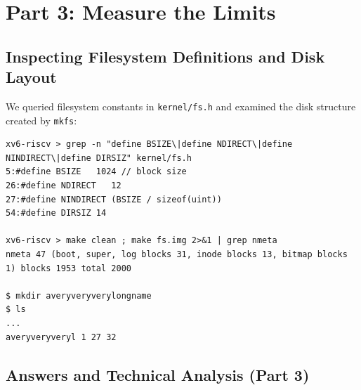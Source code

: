 \documentclass[12pt,a4paper]{article}
\begin{document}
\section{Part 3: Measure the Limits}

\subsection{Inspecting Filesystem Definitions and Disk Layout}
We queried filesystem constants in \texttt{kernel/fs.h} and examined the disk structure created by \texttt{mkfs}:

\begin{lstlisting}[style=consolestyle]
xv6-riscv > grep -n "define BSIZE\|define NDIRECT\|define NINDIRECT\|define DIRSIZ" kernel/fs.h
5:#define BSIZE   1024 // block size
26:#define NDIRECT   12
27:#define NINDIRECT (BSIZE / sizeof(uint))
54:#define DIRSIZ 14

xv6-riscv > make clean ; make fs.img 2>&1 | grep nmeta
nmeta 47 (boot, super, log blocks 31, inode blocks 13, bitmap blocks 1) blocks 1953 total 2000

$ mkdir averyveryverylongname
$ ls
...
averyveryveryl 1 27 32
\end{lstlisting}

\subsection{Answers and Technical Analysis (Part 3)}
\end{document}
